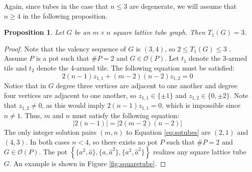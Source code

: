 \documentclass{elsarticle}
\newtheorem{proposition}[theorem]{Proposition}
\theoremstyle{definition}
\theoremstyle{remark}
\theoremstyle{plain}
\theoremstyle{plain}
\begin{document}
Again, since tubes in the case that $n \leq 3$ are degenerate, we will assume that $n \geq 4$ in the following proposition.

\begin{proposition} Let $G$ be an $m \times n$ square lattice tube graph. Then $T_1(G)=3$. \end{proposition}

\begin{proof} 
Note that the valency sequence of $G$ is $(3,4)$, so $2 \leq T_1(G) \leq 3$ \cite{ellis2014minimal}. Assume $P$ is a pot such that $\#P = 2$ and $G \in \mathcal{O}(P)$. Let $t_1$ denote the 3-armed tile and $t_2$ denote the 4-armed tile. The following equation must be satisfied:
$$2(n-1)z_{1,1}+(m-2)(n-2)z_{1,2}=0$$
Notice that in $G$ degree three vertices are adjacent to one another and degree four vertices are adjacent to one another, so $z_{1,1} \in \{\pm 1\}$ and $z_{1,2} \in \{0,\pm 2\}$. Note that $z_{1,2} \neq 0$, as this would imply $2(n-1)z_{1,1} = 0$, which is impossible since $n \neq 1$. Thus, $m$ and $n$ must satisfy the following equation:
\begin{equation}\label{eq:sqtubes} | 2(n-1) | = | 2(m-2)(n-2)|\end{equation}
The only integer solution pairs $(m,n)$ to Equation \ref{eq:sqtubes} are $(2,1)$ and $(4,3)$. In both cases $n<4$, so there exists no pot $P$ such that $\#P = 2$ and $G \in \mathcal{O}(P)$. The pot $\left\{\{a^2,\hat{a}\},\{a,\hat{a}^2\},\{a^2,\hat{a}^2\}\right\}$ realizes any square lattice tube $G$. An example is shown in Figure \ref{fig:squaretube}.
\end{proof}
\end{document}
